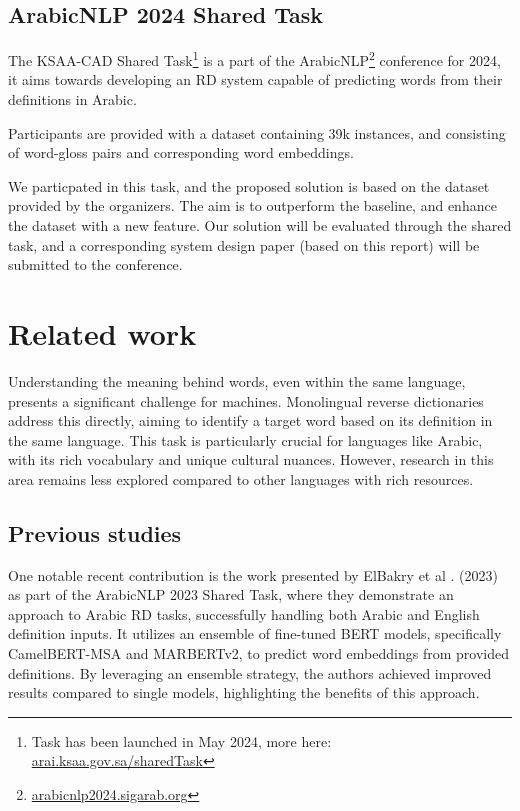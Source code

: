 \documentclass[12pt]{article}
\begin{document}
\subsection{ArabicNLP 2024 Shared Task}\label{sec:arabicnlp}

The KSAA-CAD Shared Task\footnote{Task has been launched in May 2024, more here: \href{https://arai.ksaa.gov.sa/sharedTask2024/}{arai.ksaa.gov.sa/sharedTask}} is a part of the ArabicNLP\footnote{\href{https://arabicnlp2024.sigarab.org/}{arabicnlp2024.sigarab.org}} conference for 2024, it aims towards developing an RD system capable of predicting words from their definitions in Arabic.

Participants are provided with a dataset containing 39k instances, and consisting of word-gloss pairs and corresponding word embeddings.

We particpated in this task, and the proposed solution is based on the dataset provided by the organizers. The aim is to outperform the baseline, and enhance the dataset with a new feature. Our solution will be evaluated through the shared task, and a corresponding system design paper (based on this report) will be submitted to the conference.

\newpage

\section{Related work}

Understanding the meaning behind words, even within the same language, presents a significant challenge for machines. Monolingual reverse dictionaries address this directly, aiming to identify a target word based on its definition in the same language. This task is particularly crucial for languages like Arabic, with its rich vocabulary and unique cultural nuances. However, research in this area remains less explored compared to other languages with rich resources.

\subsection{Previous studies}

One notable recent contribution is the work presented by ElBakry et al \cite{Albakry2023}. (2023) as part of the ArabicNLP 2023 Shared Task, where they demonstrate an approach to Arabic RD tasks, successfully handling both Arabic and English definition inputs. It utilizes an ensemble of fine-tuned BERT models, specifically CamelBERT-MSA and MARBERTv2, to predict word embeddings from provided definitions. By leveraging an ensemble strategy, the authors achieved improved results compared to single models, highlighting the benefits of this approach.
\end{document}
